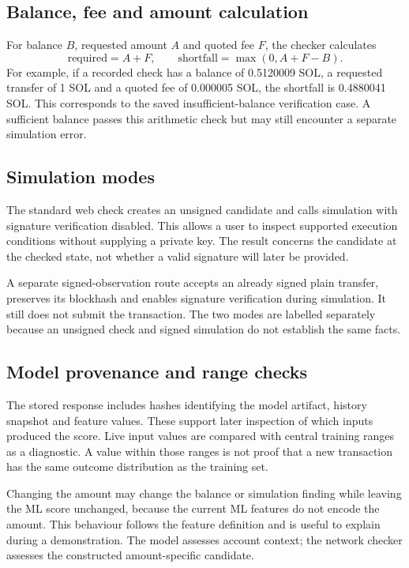 \documentclass[12pt,a4paper,oneside]{report}
\begin{document}
\subsection{Balance, fee and amount calculation}
For balance $B$, requested amount $A$ and quoted fee $F$, the checker calculates
\begin{equation}\mathrm{required}=A+F,\qquad \mathrm{shortfall}=\max(0,A+F-B).\end{equation}
For example, if a recorded check has a balance of 0.5120009 SOL, a requested transfer of 1 SOL and a quoted fee of 0.000005 SOL, the shortfall is 0.4880041 SOL. This corresponds to the saved insufficient-balance verification case. A sufficient balance passes this arithmetic check but may still encounter a separate simulation error.
\subsection{Simulation modes}
The standard web check creates an unsigned candidate and calls simulation with signature verification disabled. This allows a user to inspect supported execution conditions without supplying a private key. The result concerns the candidate at the checked state, not whether a valid signature will later be provided.

A separate signed-observation route accepts an already signed plain transfer, preserves its blockhash and enables signature verification during simulation. It still does not submit the transaction. The two modes are labelled separately because an unsigned check and signed simulation do not establish the same facts.
\subsection{Model provenance and range checks}
The stored response includes hashes identifying the model artifact, history snapshot and feature values. These support later inspection of which inputs produced the score. Live input values are compared with central training ranges as a diagnostic. A value within those ranges is not proof that a new transaction has the same outcome distribution as the training set.

Changing the amount may change the balance or simulation finding while leaving the ML score unchanged, because the current ML features do not encode the amount. This behaviour follows the feature definition and is useful to explain during a demonstration. The model assesses account context; the network checker assesses the constructed amount-specific candidate.
\end{document}
